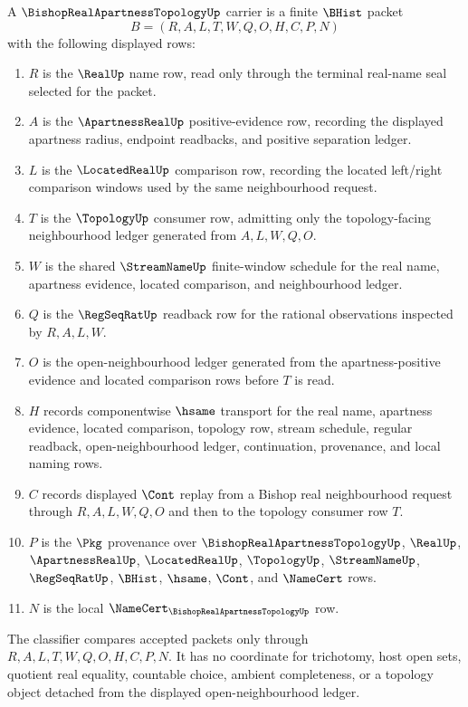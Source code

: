 \begin{definition}
\label{def:bishop-real-apartness-topology-carrier}
A $\BishopRealApartnessTopologyUp$ carrier is a finite $\BHist$ packet
$$
B=(R,A,L,T,W,Q,O,H,C,P,N)
$$
with the following displayed rows:
\begin{enumerate}
\item $R$ is the $\RealUp$ name row, read only through the terminal real-name seal selected for the packet.
\item $A$ is the $\ApartnessRealUp$ positive-evidence row, recording the displayed apartness radius, endpoint readbacks, and positive separation ledger.
\item $L$ is the $\LocatedRealUp$ comparison row, recording the located left/right comparison windows used by the same neighbourhood request.
\item $T$ is the $\TopologyUp$ consumer row, admitting only the topology-facing neighbourhood ledger generated from $A,L,W,Q,O$.
\item $W$ is the shared $\StreamNameUp$ finite-window schedule for the real name, apartness evidence, located comparison, and neighbourhood ledger.
\item $Q$ is the $\RegSeqRatUp$ readback row for the rational observations inspected by $R,A,L,W$.
\item $O$ is the open-neighbourhood ledger generated from the apartness-positive evidence and located comparison rows before $T$ is read.
\item $H$ records componentwise $\hsame$ transport for the real name, apartness evidence, located comparison, topology row, stream schedule, regular readback, open-neighbourhood ledger, continuation, provenance, and local naming rows.
\item $C$ records displayed $\Cont$ replay from a Bishop real neighbourhood request through $R,A,L,W,Q,O$ and then to the topology consumer row $T$.
\item $P$ is the $\Pkg$ provenance over $\BishopRealApartnessTopologyUp$, $\RealUp$, $\ApartnessRealUp$, $\LocatedRealUp$, $\TopologyUp$, $\StreamNameUp$, $\RegSeqRatUp$, $\BHist$, $\hsame$, $\Cont$, and $\NameCert$ rows.
\item $N$ is the local $\NameCert_{\BishopRealApartnessTopologyUp}$ row.
\end{enumerate}
The classifier compares accepted packets only through $R,A,L,T,W,Q,O,H,C,P,N$. It has no coordinate for trichotomy, host open sets, quotient real equality, countable choice, ambient completeness, or a topology object detached from the displayed open-neighbourhood ledger.
\end{definition}

